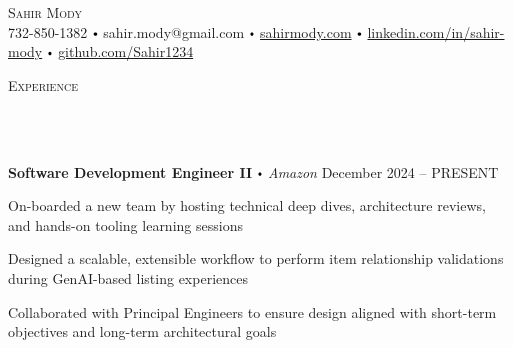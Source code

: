 \documentclass{article}
\newcommand{\contact}[3]{
\vspace*{3pt}
\begin{center}
{\Huge \scshape {#1}}\\
\vspace{0pt}
#2 
\vspace{0pt}
#3
\end{center}
\vspace*{-3pt}
}
\newcommand{\header}[1]{{
\hspace*{-15pt}\vspace*{10pt} \large \scshape{#1}} \vspace*{-6pt} 
\lineunder
}
\newcommand{\lineunder}{
\vspace*{-8pt} \\ \hspace*{-18pt} 
\hrulefill \\
}
\newcommand{\employer}[4]{
\textbf{#1} \labelitemi \textit{#2} \hfill #3 \\ #4 \vspace*{3pt}
}
\renewcommand{\labelitemi}{
$\vcenter{\hbox{\tiny$\bullet$}}$\hspace*{3pt}
}
\renewcommand{\labelitemii}{
$\vcenter{\hbox{\tiny$\bullet$}}$\hspace*{-3pt}
}
\newenvironment{bullet-list-minor}{
\begin{list}{\labelitemii}{\setlength\leftmargin{15pt} 
\topsep 0pt \itemsep 1pt}}{\vspace*{4pt}\end{list}
}
\begin{document}
\small
\vspace*{-64pt}

\contact{Sahir Mody}\bigskip
{{732-850-1382}\labelitemi{sahir.mody@gmail.com}\labelitemi\href{https://sahirmody.com}{sahirmody.com}\labelitemi\href{https://www.linkedin.com/in/sahir-mody}{linkedin.com/in/sahir-mody}  \labelitemi\href{https://www.github.com/Sahir1234}{github.com/Sahir1234}}
\medskip
\header{Experience}
    \vspace{6pt}
    \employer{Software Development Engineer II}{Amazon}{December 2024 -- PRESENT}{}
    \smallskip
    \begin{bullet-list-minor}
        \item On-boarded a new team by hosting technical deep dives, architecture reviews, and hands-on tooling learning sessions
        \item Designed a scalable, extensible workflow to perform item relationship validations  during GenAI-based listing experiences
        \item Collaborated with Principal Engineers to ensure  design aligned with short-term objectives and long-term architectural goals
    \end{bullet-list-minor}
    \medskip
    \smallskip
    
\end{document}
